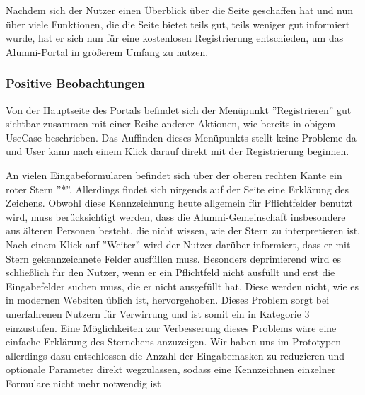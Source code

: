 Nachdem sich der Nutzer einen Überblick über die Seite geschaffen hat und nun über viele Funktionen, die die Seite
bietet teils gut, teils weniger gut informiert wurde, hat er sich nun für eine kostenlosen Registrierung entschieden, um das Alumni-Portal
in größerem Umfang zu nutzen.

\subsubsection*{Positive Beobachtungen}
Von der Hauptseite des Portals befindet sich der Menüpunkt ”Registrieren” gut sichtbar zusammen mit einer Reihe anderer Aktionen,
wie bereits in obigem UseCase beschrieben. Das Auffinden dieses Menüpunkts stellt keine Probleme da und User kann nach einem Klick darauf direkt mit der Registrierung
beginnen.


{
An vielen Eingabeformularen befindet sich über der oberen rechten Kante ein roter Stern ”*”. Allerdings findet sich nirgends auf der Seite eine Erklärung des Zeichens.
Obwohl diese Kennzeichnung heute allgemein für Pflichtfelder benutzt wird, muss berücksichtigt werden, dass die Alumni-Gemeinschaft insbesondere aus älteren Personen besteht, die nicht wissen, wie der Stern zu interpretieren ist. Nach einem Klick auf ”Weiter” wird der Nutzer darüber informiert, dass er mit Stern gekennzeichnete Felder ausfüllen muss.
}
{Besonders deprimierend wird es schließlich für den Nutzer, wenn er ein Pflichtfeld nicht ausfüllt und erst die Eingabefelder suchen muss, die er nicht ausgefüllt hat. Diese werden nicht, wie es in modernen Websiten üblich ist, hervorgehoben. Dieses Problem sorgt bei unerfahrenen Nutzern für Verwirrung und ist somit ein in Kategorie 3 einzustufen.
}
{Eine Möglichkeiten zur Verbesserung dieses Problems wäre eine einfache Erklärung des Sternchens anzuzeigen. Wir haben uns im Prototypen allerdings dazu entschlossen die Anzahl der Eingabemasken zu reduzieren und optionale Parameter direkt wegzulassen, sodass eine Kennzeichnen einzelner Formulare nicht mehr notwendig ist
}

